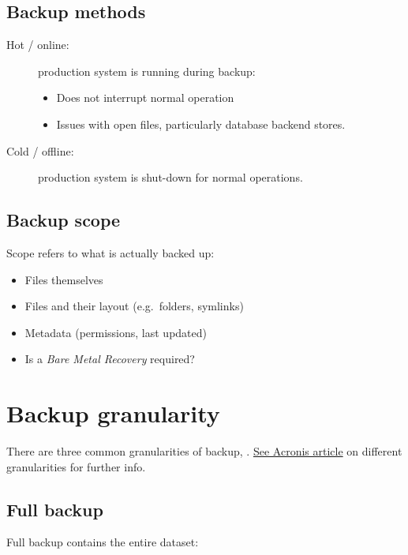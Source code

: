 \subsection{Backup methods}
\label{sec:backup-methods}

\begin{description}
\item[Hot / online:]
production system is running during backup:

\begin{itemize}
\item
  Does not interrupt normal operation
\item
  Issues with open files, particularly database backend stores.
\end{itemize}
\item[Cold / offline:]
production system is shut-down for normal operations.
\end{description}

\subsection{Backup scope}
\label{sec:backup-scope}

Scope refers to what is actually backed up:

\begin{itemize}
\item
  Files themselves
\item
  Files and their layout (e.g.~folders, symlinks)
\item
  Metadata (permissions, last updated)
\item
  Is a \emph{Bare Metal Recovery} required?
\end{itemize}

\section{Backup granularity}
\label{sec:backup-granularity}

There are three common granularities of backup, .
\href{https://www.acronis.com/en-us/articles/incremental-differential-backups/}{See
Acronis article} on different granularities for further info.

\subsection{Full backup}
\label{sec:full-backup}

Full backup contains the entire dataset:

